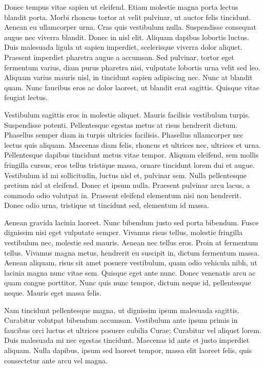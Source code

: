 \documentclass[openright]{book} %
\begin{document}
Donec tempus vitae sapien ut eleifend. Etiam molestie magna porta lectus blandit porta. Morbi rhoncus tortor at velit pulvinar, ut auctor felis tincidunt. Aenean eu ullamcorper urna. Cras quis vestibulum nulla. Suspendisse consequat augue nec viverra blandit. Donec in nisl elit. Aliquam dapibus lobortis luctus. Duis malesuada ligula ut sapien imperdiet, scelerisque viverra dolor aliquet. Praesent imperdiet pharetra augue a accumsan. Sed pulvinar, tortor eget fermentum varius, diam purus pharetra nisi, vulputate lobortis urna velit sed leo. Aliquam varius mauris nisl, in tincidunt sapien adipiscing nec. Nunc at blandit quam. Nunc faucibus eros ac dolor laoreet, ut blandit erat sagittis. Quisque vitae feugiat lectus.

Vestibulum sagittis eros in molestie aliquet. Mauris facilisis vestibulum turpis. Suspendisse potenti. Pellentesque egestas metus at risus hendrerit dictum. Phasellus semper diam in turpis ultricies facilisis. Phasellus ullamcorper nec lectus quis aliquam. Maecenas diam felis, rhoncus et ultrices nec, ultrices et urna. Pellentesque dapibus tincidunt metus vitae tempor. Aliquam eleifend, sem mollis fringilla cursus, eros tellus tristique massa, ornare tincidunt lorem dui et augue. Vestibulum id mi sollicitudin, luctus nisl et, pulvinar sem. Nulla pellentesque pretium nisl at eleifend. Donec et ipsum nulla. Praesent pulvinar arcu lacus, a commodo odio volutpat in. Praesent eleifend elementum nisi non hendrerit. Donec odio urna, tristique ut tincidunt sed, elementum id massa.

Aenean gravida lacinia laoreet. Nunc bibendum justo sed porta bibendum. Fusce dignissim nisi eget vulputate semper. Vivamus risus tellus, molestie fringilla vestibulum nec, molestie sed mauris. Aenean nec tellus eros. Proin at fermentum tellus. Vivamus magna metus, hendrerit eu suscipit in, dictum fermentum massa. Aenean aliquam, risus sit amet posuere vestibulum, quam odio vehicula nibh, ut lacinia magna nunc vitae sem. Quisque eget ante nunc. Donec venenatis arcu ac quam congue porttitor. Nunc quis nunc tempor, dictum neque id, pellentesque neque. Mauris eget massa felis.

Nam tincidunt pellentesque magna, ut dignissim ipsum malesuada sagittis. Curabitur volutpat bibendum accumsan. Vestibulum ante ipsum primis in faucibus orci luctus et ultrices posuere cubilia Curae; Curabitur vel aliquet lorem. Duis malesuada mi nec egestas tincidunt. Maecenas id ante et justo imperdiet aliquam. Nulla dapibus, ipsum sed laoreet tempor, massa elit laoreet felis, quis consectetur ante arcu vel magna.
\end{document}

